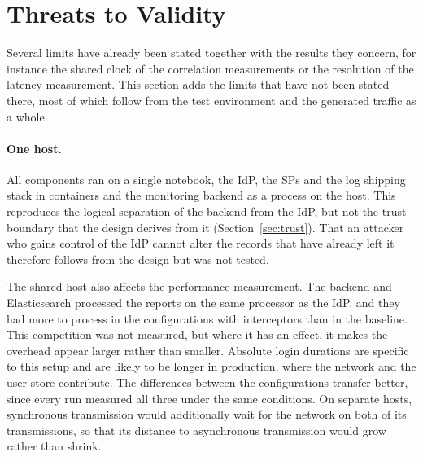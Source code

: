 \documentclass[../main.tex]{subfiles}
\begin{document}
\section{Threats to Validity}\label{sec:validity}

Several limits have already been stated together with the results they concern, for instance the 
shared clock of the correlation measurements or the resolution of the latency measurement. 
This section adds the limits that have not been stated there, most of which follow from the test 
environment and the generated traffic as a whole.

\paragraph{One host.}
All components ran on a single notebook, the IdP, the SPs and the log shipping stack in containers 
and the monitoring backend as a process on the host. 
This reproduces the logical separation of the backend from the IdP, but not the trust boundary that 
the design derives from it (Section~\ref{sec:trust}). 
That an attacker who gains control of the IdP cannot alter the records that have already left it 
therefore follows from the design but was not tested.

The shared host also affects the performance measurement. 
The backend and Elasticsearch processed the reports on the same processor as the IdP, and they had 
more to process in the configurations with interceptors than in the baseline. 
This competition was not measured, but where it has an effect, it makes the overhead appear larger 
rather than smaller. 
Absolute login durations are specific to this setup and are likely to be longer in production, 
where the network and the user store contribute. 
The differences between the configurations transfer better, since every run measured all three 
under the same conditions. 
On separate hosts, synchronous transmission would additionally wait for the network on both of its 
transmissions, so that its distance to asynchronous transmission would grow rather than shrink.
\end{document}
